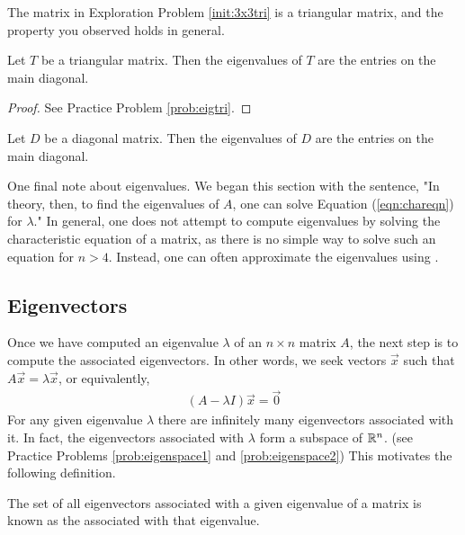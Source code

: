 \documentclass{ximera}
\begin{document}
The matrix in Exploration Problem \ref{init:3x3tri} is a triangular matrix, and the property you observed holds in general.

\begin{theorem}\label{th:eigtri}
Let $T$ be a triangular matrix.  Then the eigenvalues of $T$ are the entries on the main diagonal.
\end{theorem}

\begin{proof}
See Practice Problem \ref{prob:eigtri}.
\end{proof}

\begin{corollary}\label{th:eigdiag}
Let $D$ be a diagonal matrix.  Then the eigenvalues of $D$ are the entries on the main diagonal.
\end{corollary}

One final note about eigenvalues.  We began this section with the sentence, "In theory, then, to find the eigenvalues of $A$, one can solve Equation (\ref{eqn:chareqn}) for $\lambda$."  In general, one does not attempt to compute eigenvalues by solving the characteristic equation of a matrix, as there is no simple way to solve such an equation for $n>4$.  Instead, one can often approximate the eigenvalues using .  

\subsection{Eigenvectors}
Once we have computed an eigenvalue $\lambda$ of an $n \times n$ matrix $A$, the next step is to compute the associated eigenvectors.  In other words, we seek vectors $\vec{x}$ such that $A\vec{x}=\lambda \vec{x}$, or equivalently,
\begin{align}\label{eqn:nullspace}
 (A-\lambda I) \vec{x}=\vec{0}   
\end{align} 
For any given eigenvalue $\lambda$ there are infinitely many eigenvectors associated with it.  In fact, the eigenvectors associated with $\lambda$ form a subspace of $\mathbb{R}^n$. (see Practice Problems \ref{prob:eigenspace1} and \ref{prob:eigenspace2})  This motivates the following definition.

\begin{definition}\label{def:eigspace}
The set of all eigenvectors associated with a given eigenvalue of a matrix is known as the  associated with that eigenvalue.
\end{definition}
\end{document}
